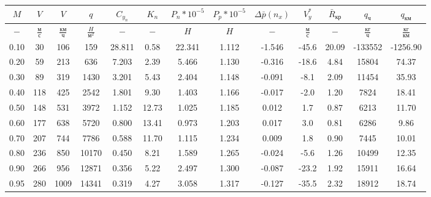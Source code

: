 \begin{tabular}{|c|c|c|c|c|c|c|c|c|c|c|c|c|}
\hline
$M$ & $V$ & $V$ & $q$ & $C_{y_n}$ & $K_n$ & $P_n*10^{-5}$ & $P_p*10^{-5}$ & $\Delta \bar{p}(n_x)$ & $V_y^*$ & $\bar{R}_{кр}$ & $q_{ч}$ & $q_{км}$ \\ 
\hline
$-$ & $\frac{м}{с}$ & $\frac{км}{ч}$ & $\frac{H}{м^2}$ & $-$ & $-$ & $H$ & $H$ & $-$ & $\frac{м}{с}$ & $-$ & $\frac{кг}{ч}$ & $\frac{кг}{км}$ \\ 
\hline
0.10 & 30 & 106 & 159 & 28.811 & 0.58 & 22.341 & 1.112 & -1.546 & -45.6 & 20.09 & -133552 & -1256.90 \\ 
\hline
0.20 & 59 & 213 & 636 & 7.203 & 2.39 & 5.466 & 1.130 & -0.316 & -18.6 & 4.84 & 15804 & 74.37 \\ 
\hline
0.30 & 89 & 319 & 1430 & 3.201 & 5.43 & 2.404 & 1.148 & -0.091 & -8.1 & 2.09 & 11454 & 35.93 \\ 
\hline
0.40 & 118 & 425 & 2542 & 1.801 & 9.30 & 1.403 & 1.166 & -0.017 & -2.0 & 1.20 & 7824 & 18.41 \\ 
\hline
0.50 & 148 & 531 & 3972 & 1.152 & 12.73 & 1.025 & 1.185 & 0.012 & 1.7 & 0.87 & 6213 & 11.70 \\ 
\hline
0.60 & 177 & 638 & 5720 & 0.800 & 13.41 & 0.973 & 1.203 & 0.017 & 3.0 & 0.81 & 6286 & 9.86 \\ 
\hline
0.70 & 207 & 744 & 7786 & 0.588 & 11.70 & 1.115 & 1.234 & 0.009 & 1.8 & 0.90 & 7445 & 10.01 \\ 
\hline
0.80 & 236 & 850 & 10170 & 0.450 & 8.21 & 1.589 & 1.265 & -0.024 & -5.6 & 1.26 & 10499 & 12.35 \\ 
\hline
0.90 & 266 & 956 & 12871 & 0.356 & 5.22 & 2.497 & 1.300 & -0.087 & -23.2 & 1.92 & 15911 & 16.64 \\ 
\hline
0.95 & 280 & 1009 & 14341 & 0.319 & 4.27 & 3.058 & 1.317 & -0.127 & -35.5 & 2.32 & 18912 & 18.74 \\ 
\hline
\end{tabular}